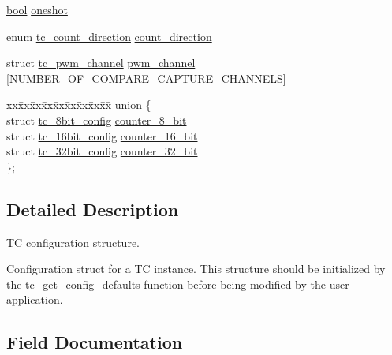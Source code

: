 \begin{DoxyCompactItemize}
\item 
\mbox{\hyperlink{group__group__sam0__utils_ga97a80ca1602ebf2303258971a2c938e2}{bool}} \mbox{\hyperlink{structtc__config_a37dc77f178f39540e01854d81ff0607c}{oneshot}}
\item 
enum \mbox{\hyperlink{group__asfdoc__sam0__tc__group_ga28777c47943dfb2b5de0fd7ae14eac1f}{tc\+\_\+count\+\_\+direction}} \mbox{\hyperlink{structtc__config_a1caed956de0dc0e40514dc3ea29692bb}{count\+\_\+direction}}
\item 
struct \mbox{\hyperlink{structtc__pwm__channel}{tc\+\_\+pwm\+\_\+channel}} \mbox{\hyperlink{structtc__config_a457ab1c40216faa466b039961734b5e1}{pwm\+\_\+channel}} \mbox{[}\mbox{\hyperlink{group__asfdoc__sam0__tc__group_gac837f9db5df1793578c195a979c6a9d3}{N\+U\+M\+B\+E\+R\+\_\+\+O\+F\+\_\+\+C\+O\+M\+P\+A\+R\+E\+\_\+\+C\+A\+P\+T\+U\+R\+E\+\_\+\+C\+H\+A\+N\+N\+E\+LS}}\mbox{]}
\item 
\begin{tabbing}
xx\=xx\=xx\=xx\=xx\=xx\=xx\=xx\=xx\=\kill
union \{\\
\>struct \mbox{\hyperlink{structtc__8bit__config}{tc\_8bit\_config}} \mbox{\hyperlink{structtc__config_aca10368efd9e0e99944c4caeb0e21631}{counter\_8\_bit}}\\
\>struct \mbox{\hyperlink{structtc__16bit__config}{tc\_16bit\_config}} \mbox{\hyperlink{structtc__config_a0e6abf2c2116b8e204f8f6cdf6bef8c9}{counter\_16\_bit}}\\
\>struct \mbox{\hyperlink{structtc__32bit__config}{tc\_32bit\_config}} \mbox{\hyperlink{structtc__config_ab222fff8b8077a124494df5b661ec75b}{counter\_32\_bit}}\\
\}; \\

\end{tabbing}\end{DoxyCompactItemize}


\subsection{Detailed Description}
TC configuration structure. 

Configuration struct for a TC instance. This structure should be initialized by the tc\+\_\+get\+\_\+config\+\_\+defaults function before being modified by the user application. 

\subsection{Field Documentation}
\mbox{\label{structtc__config_a1e749a74717dd20f1fd0a934ef785528}} 
